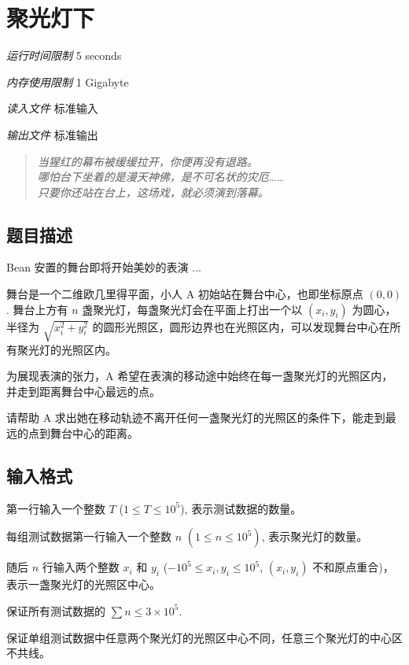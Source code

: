 \section[A. 聚光灯下]{ 聚光灯下}

\textit{运行时间限制}   5 seconds

\textit{内存使用限制} 1 Gigabyte

\textit{读入文件} \qquad 标准输入

\textit{输出文件} \qquad 标准输出


\begin{quote}
	\textit{当猩红的幕布被缓缓拉开，你便再没有退路。\\
哪怕台下坐着的是漫天神佛，是不可名状的灾厄……\\
只要你还站在台上，这场戏，就必须演到落幕。}
\end{quote}

\subsection{题目描述}

Bean 安置的舞台即将开始美妙的表演 ...

舞台是一个二维欧几里得平面，小人 A 初始站在舞台中心，也即坐标原点 $(0, 0)$. 舞台上方有 $n$ 盏聚光灯，每盏聚光灯会在平面上打出一个以 $(x_i, y_i)$ 为圆心，半径为 $\sqrt{x_i^2 + y_i^2}$ 的圆形光照区，圆形边界也在光照区内，可以发现舞台中心在所有聚光灯的光照区内。

为展现表演的张力，A 希望在表演的移动途中始终在每一盏聚光灯的光照区内，并走到距离舞台中心最远的点。

请帮助 A 求出她在移动轨迹不离开任何一盏聚光灯的光照区的条件下，能走到最远的点到舞台中心的距离。

\subsection{输入格式}

第一行输入一个整数 $T$ ($1 \le T \le 10^5$), 表示测试数据的数量。

每组测试数据第一行输入一个整数 $n$ $(1 \le n \le 10^5)$, 表示聚光灯的数量。

随后 $n$ 行输入两个整数 $x_i$ 和 $y_i$ ($-10^5 \le x_i, y_i \le 10^5$, $(x_i, y_i)$ 不和原点重合)，表示一盏聚光灯的光照区中心。

保证所有测试数据的 $\sum n \le 3 \times 10^5$.

保证单组测试数据中任意两个聚光灯的光照区中心不同，任意三个聚光灯的中心区不共线。

